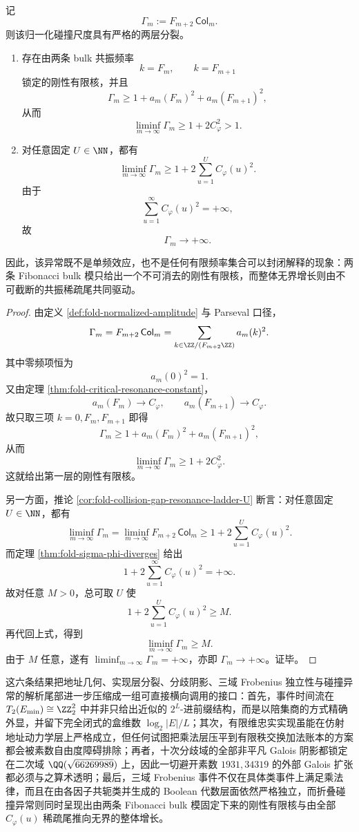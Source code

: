 \begin{theorem}[共振异常的刚性有限核与不可截断无限尾]\label{thm:xi-time-part75-resonance-anomaly-rigid-core-infinite-tail}
记
\[
\Gamma_m:=F_{m+2}\,\mathsf{Col}_m.
\]
则该归一化碰撞尺度具有严格的两层分裂。
\begin{enumerate}
  \item 存在由两条 bulk 共振频率
  \[
  k=F_m,\qquad k=F_{m+1}
  \]
  锁定的刚性有限核，并且
  \[
  \Gamma_m\ge 1+a_m(F_m)^2+a_m(F_{m+1})^2,
  \]
  从而
  \[
  \liminf_{m\to\infty}\Gamma_m\ge 1+2C_\varphi^2>1.
  \]
  \item 对任意固定 \(U\in\NN\)，都有
  \[
  \liminf_{m\to\infty}\Gamma_m
  \ge
  1+2\sum_{u=1}^{U}C_\varphi(u)^2.
  \]
  由于
  \[
  \sum_{u=1}^{\infty}C_\varphi(u)^2=+\infty,
  \]
  故
  \[
  \Gamma_m\longrightarrow +\infty.
  \]
\end{enumerate}
因此，该异常既不是单频效应，也不是任何有限频率集合可以封闭解释的现象：两条 Fibonacci bulk 模只给出一个不可消去的刚性有限核，而整体无界增长则由不可截断的共振稀疏尾共同驱动。
\end{theorem}
\begin{proof}
由定义 \ref{def:fold-normalized-amplitude} 与 Parseval 口径，
\[
\Gamma_m=F_{m+2}\,\mathsf{Col}_m=\sum_{k\in \ZZ/(F_{m+2}\ZZ)}a_m(k)^2.
\]
其中零频项恒为
\[
a_m(0)^2=1.
\]
又由定理 \ref{thm:fold-critical-resonance-constant}，
\[
a_m(F_m)\longrightarrow C_\varphi,
\qquad
a_m(F_{m+1})\longrightarrow C_\varphi.
\]
故只取三项 \(k=0,F_m,F_{m+1}\) 即得
\[
\Gamma_m\ge 1+a_m(F_m)^2+a_m(F_{m+1})^2,
\]
从而
\[
\liminf_{m\to\infty}\Gamma_m\ge 1+2C_\varphi^2.
\]
这就给出第一层的刚性有限核。

另一方面，推论 \ref{cor:fold-collision-gap-resonance-ladder-U} 断言：对任意固定 \(U\in\NN\)，都有
\[
\liminf_{m\to\infty}\Gamma_m
=
\liminf_{m\to\infty}F_{m+2}\,\mathsf{Col}_m
\ge
1+2\sum_{u=1}^{U}C_\varphi(u)^2.
\]
而定理 \ref{thm:fold-sigma-phi-diverges} 给出
\[
1+2\sum_{u=1}^{\infty}C_\varphi(u)^2=+\infty.
\]
故对任意 \(M>0\)，总可取 \(U\) 使
\[
1+2\sum_{u=1}^{U}C_\varphi(u)^2\ge M.
\]
再代回上式，得到
\[
\liminf_{m\to\infty}\Gamma_m\ge M.
\]
由于 \(M\) 任意，遂有 \(\liminf_{m\to\infty}\Gamma_m=+\infty\)，亦即 \(\Gamma_m\to+\infty\)。证毕。
\end{proof}

\noindent
这六条结果把地址几何、实现层分裂、分歧阴影、三域 Frobenius 独立性与碰撞异常的解析尾部进一步压缩成一组可直接横向调用的接口：首先，事件时间流在 \(T_2(E_{\min})\cong \ZZ_2^2\) 中并非只给出近似的 \(2^L\)-进前缀结构，而是以陪集商的方式精确外显，并留下完全闭式的盒维数 \(\log_2|E|/L\)；其次，有限维忠实实现虽能在仿射地址动力学层上严格成立，但任何试图把乘法层压平到有限秩交换加法账本的方案都会被素数自由度障碍排除；再者，十次分歧域的全部非平凡 Galois 阴影都锁定在二次域 \(\QQ(\sqrt{66269989})\) 上，因此一切避开素数 \(1931,34319\) 的外部 Galois 扩张都必须与之算术透明；最后，三域 Frobenius 事件不仅在具体类事件上满足乘法律，而且在由各因子共轭类并生成的 Boolean 代数层面依然严格独立，而折叠碰撞异常则同时呈现出由两条 Fibonacci bulk 模固定下来的刚性有限核与由全部 \(C_\varphi(u)\) 稀疏尾推向无界的整体增长。





\endinput
